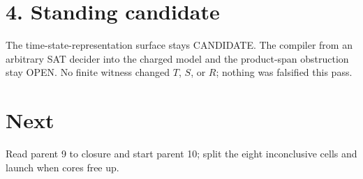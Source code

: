 \documentclass[11pt]{article}
\begin{document}
\section*{4. Standing candidate}
The time-state-representation surface stays CANDIDATE. The compiler from an arbitrary SAT decider into the charged model and the product-span obstruction stay OPEN. No finite witness changed $T$, $S$, or $R$; nothing was falsified this pass.

\section*{Next}
Read parent 9 to closure and start parent 10; split the eight inconclusive cells and launch  when cores free up.
\end{document}
